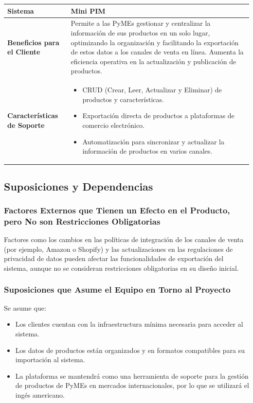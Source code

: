 \documentclass[12pt.a4paper]{article}
\begin{document}
\begin{table}[H]
\centering
\begin{tabular}{|l|p{10cm}|}
    \hline
    \textbf{Sistema} & Mini PIM \\
    \hline
    \textbf{Beneficios para el Cliente} & Permite a las PyMEs gestionar y centralizar la información de sus productos en un solo lugar, optimizando la organización y facilitando la exportación de estos datos a los canales de venta en línea. Aumenta la eficiencia operativa en la actualización y publicación de productos. \\
    \hline
    \textbf{Características de Soporte} & 
    \begin{itemize}
        \item CRUD (Crear, Leer, Actualizar y Eliminar) de productos y características.
        \item Exportación directa de productos a plataformas de comercio electrónico.
        \item Automatización para sincronizar y actualizar la información de productos en varios canales.
    \end{itemize} \\
    \hline
\end{tabular}
\end{table}


\subsection{Suposiciones y Dependencias}

\subsubsection{Factores Externos que Tienen un Efecto en el Producto, pero No son Restricciones Obligatorias}
Factores como los cambios en las políticas de integración de los canales de venta (por ejemplo, Amazon o Shopify) y las actualizaciones en las regulaciones de privacidad de datos pueden afectar las funcionalidades de exportación del sistema, aunque no se consideran restricciones obligatorias en su diseño inicial.

\subsubsection{Suposiciones que Asume el Equipo en Torno al Proyecto}
Se asume que:
\begin{itemize}
    \item Los clientes cuentan con la infraestructura mínima necesaria para acceder al sistema.
    \item Los datos de productos están organizados y en formatos compatibles para su importación al sistema.
    \item La plataforma se mantendrá como una herramienta de soporte para la gestión de productos de PyMEs en mercados internacionales, por lo que se utilizará el ingés americano.
\end{itemize}
\end{document}
